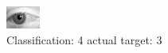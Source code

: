 \begin{figure}[h!]
\begin{center}
\includegraphics[width=0.60\columnwidth]{figures/ID2805_class_4_target_3.png}
\end{center}
\caption{ Classification: 4 actual target: 3}
\label{fig:ID2805_class_4_target_3}
\end{figure}
